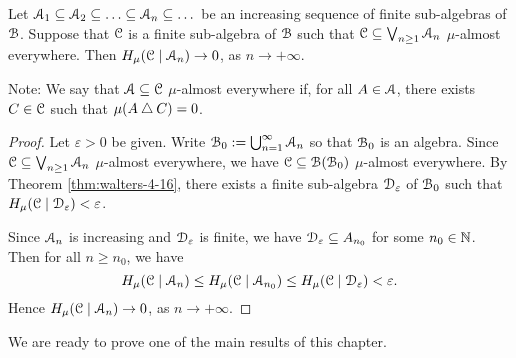 \begin{corollary} \label{cor:walters-4-16-1}
	Let $\A_1 \subset \A_2 \subset \dots \subset \A_n \subset \dots$ be an increasing sequence of finite sub-algebras of $\mathcal{B}$. Suppose that $\mathcal{C}$ is a finite sub-algebra of $\mathcal{B}$ such that $\mathcal{C} \subseteq \bigvee_{n \geq 1}{\mathcal{A}_n}$ $\mu$-almost everywhere. Then $H_\mu(\mathcal{C} \mid \mathcal{A}_n) \to 0$, as $n \to +\infty$.
	
	Note: We say that $\mathcal{A} \subseteq \mathcal{C}$ $\mu$-almost everywhere if, for all $A \in \mathcal{A}$, there exists $C \in \mathcal{C}$ such that $\mu(A \bigtriangleup C) = 0$.
	
	\begin{proof}
		Let $\varepsilon > 0$ be given. Write $\mathcal{B}_0 := \bigcup_{n = 1}^\infty{\mathcal{A}_n}$ so that $\mathcal{B}_0$ is an algebra. Since $\mathcal{C} \subseteq \bigvee_{n \geq 1}{\mathcal{A}_n}$ $\mu$-almost everywhere, we have $\mathcal{C} \subseteq \mathcal{B}(\mathcal{B}_0)$ $\mu$-almost everywhere. By Theorem \ref{thm:walters-4-16}, there exists a finite sub-algebra $\mathcal{D}_\varepsilon$ of $\mathcal{B}_0$ such that $H_\mu(\mathcal{C} \mid \mathcal{D}_\varepsilon) < \varepsilon$.
		
		Since $\mathcal{A}_n$ is increasing and $\mathcal{D}_\varepsilon$ is finite, we have $\mathcal{D}_\varepsilon \subseteq A_{n_0}$ for some $n_0 \in \mathbb{N}$. Then for all $n \geq n_0$, we have
		\[
			H_\mu(\mathcal{C} \mid \mathcal{A}_n) \leq H_\mu(\mathcal{C} \mid \mathcal{A}_{n_0}) \leq H_\mu(\mathcal{C} \mid \mathcal{D}_\varepsilon) < \varepsilon.
		\]
		Hence $H_\mu(\mathcal{C} \mid \mathcal{A}_n) \to 0$, as $n \to +\infty$.
	\end{proof}
\end{corollary}

We are ready to prove one of the main results of this chapter.

